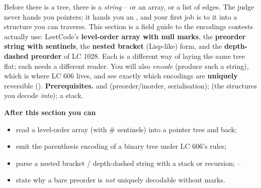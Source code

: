 \begin{topicintro}
Before there is a tree, there is a \emph{string} -- or an array, or a list of edges. The
judge never hands you pointers; it hands you an , and your first job is to
 it into a structure you can traverse. This section is a field guide to the
encodings contests actually use: LeetCode's \textbf{level-order array with null
marks}, the \textbf{preorder string with sentinels}, the \textbf{nested bracket} (Lisp-like)
form, and the \textbf{depth-dashed preorder} of LC 1028. Each is a different way of laying
the same tree flat; each needs a different reader. You will also \emph{encode} (produce such
a string), which is where LC 606 lives, and see exactly which encodings are
\textbf{uniquely} reversible ().
\textbf{Prerequisites.}  and  (preorder/inorder,
serialisation);  (the structures you decode \emph{into}); a stack.

\textbf{After this section you can}
\begin{itemize}[nosep]
  \item read a level-order array (with \# sentinels) into a pointer tree and back;   \hfill{}
  \item emit the parenthesis encoding of a binary tree under LC 606's rules; \hfill{}
  \item parse a nested bracket / depth-dashed string with a stack or recursion;      \hfill{}--
  \item state why a bare preorder is \emph{not} uniquely decodable without marks.     \hfill{}
\end{itemize}
\end{topicintro}

